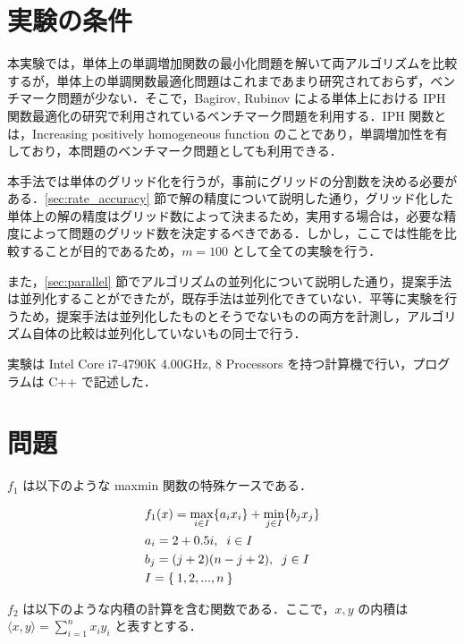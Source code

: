 \documentclass[a4paper,11pt]{jreport}
\begin{document}
\section{実験の条件}

本実験では，単体上の単調増加関数の最小化問題を解いて両アルゴリズムを比較するが，単体上の単調関数最適化問題はこれまであまり研究されておらず，ベンチマーク問題が少ない．そこで，Bagirov, Rubinov \cite{bagirov} による単体上における IPH 関数最適化の研究で利用されているベンチマーク問題を利用する．IPH 関数とは，Increasing positively homogeneous function のことであり，単調増加性を有しており，本問題のベンチマーク問題としても利用できる．\par
本手法では単体のグリッド化を行うが，事前にグリッドの分割数を決める必要がある．\ref{sec:rate_accuracy} 節で解の精度について説明した通り，グリッド化した単体上の解の精度はグリッド数によって決まるため，実用する場合は，必要な精度によって問題のグリッド数を決定するべきである．しかし，ここでは性能を比較することが目的であるため，$ m = 100 $ として全ての実験を行う．\par
また，\ref{sec:parallel} 節でアルゴリズムの並列化について説明した通り，提案手法は並列化することができたが，既存手法は並列化できていない．平等に実験を行うため，提案手法は並列化したものとそうでないものの両方を計測し，アルゴリズム自体の比較は並列化していないもの同士で行う．\par
実験は Intel Core i7-4790K 4.00GHz, 8 Processors を持つ計算機で行い，プログラムは C++ で記述した．\par

\section{問題}

$ f_1 $ は以下のような maxmin 関数の特殊ケースである．\par

\begin{align*}
& f_1(x) = \max_{i \in I} \{a_i x_i \} + \min_{j \in I} \{b_j x_j \} \\
& a_i = 2 + 0.5 i, \;\; i \in I \\
& b_j = (j + 2) (n - j + 2), \;\; j \in I \\
& I = \Set{1, 2, ..., n}
\end{align*}

$ f_2 $ は以下のような内積の計算を含む関数である．ここで，$ x, y $ の内積は $ \langle x, y \rangle = \sum_{i = 1}^{n} x_i y_i $ と表すとする．\par
\end{document}
